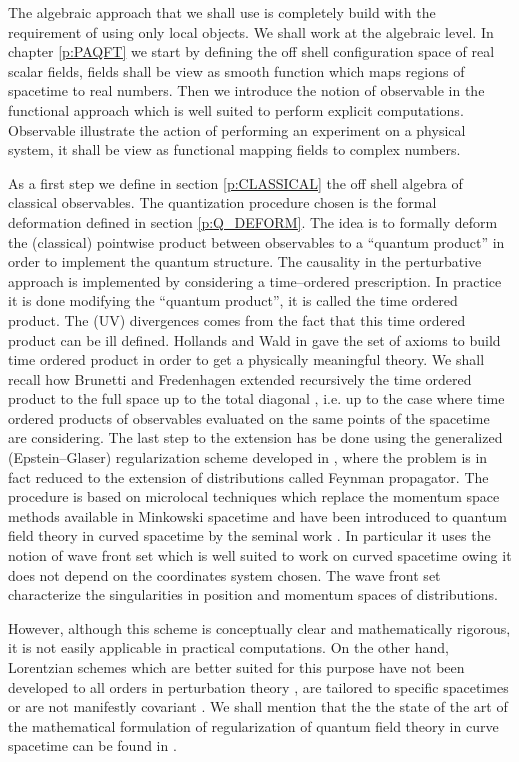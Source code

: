 \documentclass[11pt]{book}
\theoremstyle{break}
\begin{document}
The algebraic approach that we shall use is completely build with the requirement of using only local objects. We shall work at the algebraic level. In chapter \ref{p:PAQFT} we start by defining the off shell configuration space of real scalar fields, fields shall be view as smooth function which maps regions of spacetime to real numbers. Then we introduce the notion of observable in the functional approach which is well suited to perform explicit computations. Observable illustrate the action of performing an experiment on a physical system, it shall be view as functional mapping fields to complex numbers. 


As a first step we define in section \ref{p:CLASSICAL} the off shell algebra of classical observables. The quantization procedure chosen is the formal deformation defined in section \ref{p:Q_DEFORM}. The idea is to formally deform the (classical) pointwise product between observables to a ``quantum product'' in order to implement the quantum structure. The causality in the perturbative approach is implemented by considering a time--ordered prescription. In practice it is done modifying the ``quantum product'', it is called the time ordered product. The (UV) divergences comes from the fact that this time ordered product can be ill defined. Hollands and Wald in \cite{HW_2001,HW_2002} gave the set of axioms to build time ordered product in order to get a physically meaningful theory. We shall recall how Brunetti and Fredenhagen extended recursively the time ordered product to the full space up to the total diagonal \cite{BF_2000}, i.e. up to the case where time ordered products of observables evaluated on the same points of the spacetime are considering. The last step to the extension has be done using the generalized (Epstein--Glaser) regularization scheme developed in \cite{BF_2000,HW_2001,HW_2005}, where the problem is in fact reduced to the extension of distributions called Feynman propagator. The procedure is based on microlocal techniques which replace the momentum space methods available in Minkowski spacetime and have been introduced to quantum field theory in curved spacetime by the seminal work \cite{RADZIKOWSKI_1996}. In particular it uses the notion of wave front set which is well suited to work on curved spacetime owing it does not depend on the coordinates system chosen. The wave front set characterize the singularities in position and momentum spaces of distributions.\par%


However, although this scheme is conceptually clear and mathematically rigorous, it is not easily applicable in practical computations. On the other hand, Lorentzian schemes which are better suited for this purpose have not been developed to all orders in perturbation theory \cite{CHL_1995,PRANGE_1999}, are tailored to specific spacetimes \cite{HOLLANDS_2010} or are not manifestly covariant \cite{BCK_2010}. We shall mention that the the state of the art of the mathematical formulation of regularization of quantum field theory in curve spacetime can be found in \cite{DANG_2013}.\par%
\end{document}
